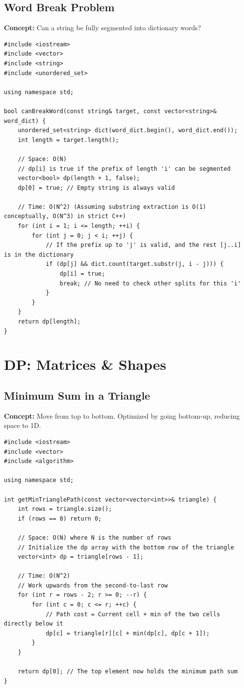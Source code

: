\subsection{Word Break Problem}
\textbf{Concept:} Can a string be fully segmented into dictionary words?

\begin{lstlisting}
#include <iostream>
#include <vector>
#include <string>
#include <unordered_set>

using namespace std;

bool canBreakWord(const string& target, const vector<string>& word_dict) {
    unordered_set<string> dict(word_dict.begin(), word_dict.end());
    int length = target.length();
    
    // Space: O(N)
    // dp[i] is true if the prefix of length 'i' can be segmented
    vector<bool> dp(length + 1, false);
    dp[0] = true; // Empty string is always valid
    
    // Time: O(N^2) (Assuming substring extraction is O(1) conceptually, O(N^3) in strict C++)
    for (int i = 1; i <= length; ++i) {
        for (int j = 0; j < i; ++j) {
            // If the prefix up to 'j' is valid, and the rest [j..i] is in the dictionary
            if (dp[j] && dict.count(target.substr(j, i - j))) {
                dp[i] = true;
                break; // No need to check other splits for this 'i'
            }
        }
    }
    return dp[length];
}
\end{lstlisting}


\section{DP: Matrices \& Shapes}

\subsection{Minimum Sum in a Triangle}
\textbf{Concept:} Move from top to bottom. Optimized by going bottom-up, reducing space to 1D.

\begin{lstlisting}
#include <iostream>
#include <vector>
#include <algorithm>

using namespace std;

int getMinTrianglePath(const vector<vector<int>>& triangle) {
    int rows = triangle.size();
    if (rows == 0) return 0;
    
    // Space: O(N) where N is the number of rows
    // Initialize the dp array with the bottom row of the triangle
    vector<int> dp = triangle[rows - 1];
    
    // Time: O(N^2)
    // Work upwards from the second-to-last row
    for (int r = rows - 2; r >= 0; --r) {
        for (int c = 0; c <= r; ++c) {
            // Path cost = Current cell + min of the two cells directly below it
            dp[c] = triangle[r][c] + min(dp[c], dp[c + 1]);
        }
    }
    
    return dp[0]; // The top element now holds the minimum path sum
}
\end{lstlisting}

